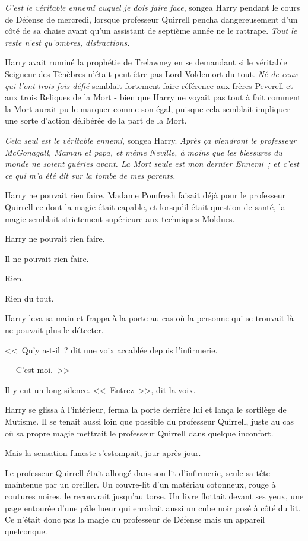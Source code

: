 \emph{C'est le véritable ennemi auquel je dois faire face}, songea Harry pendant le cours de Défense de mercredi, lorsque professeur Quirrell pencha dangereusement d'un côté de sa chaise avant qu'un assistant de septième année ne le rattrape. \emph{Tout le reste n'est qu'ombres, distractions.}

Harry avait ruminé la prophétie de Trelawney en se demandant si le véritable Seigneur des Ténèbres n'était peut être pas Lord Voldemort du tout. \emph{Né de ceux qui l'ont trois fois défié} semblait fortement faire référence aux frères Peverell et aux trois Reliques de la Mort - bien que Harry ne voyait pas tout à fait comment la Mort aurait pu le marquer comme son égal, puisque cela semblait impliquer une sorte d'action délibérée de la part de la Mort.

\emph{Cela seul est le véritable ennemi}, songea Harry. \emph{Après ça viendront le professeur McGonagall, Maman et papa, et même Neville, à moins que les blessures du monde ne soient guéries avant. La Mort seule est mon dernier Ennemi~; et c'est ce qui m'a été dit sur la tombe de mes parents.}

Harry ne pouvait rien faire. Madame Pomfresh faisait déjà pour le professeur Quirrell ce dont la magie était capable, et lorsqu'il était question de santé, la magie semblait strictement supérieure aux techniques Moldues.

Harry ne pouvait rien faire.

Il ne pouvait rien faire.

Rien.

Rien du tout.

\later

Harry leva sa main et frappa à la porte au cas où la personne qui se trouvait là ne pouvait plus le détecter.

<<~Qu'y a-t-il~? dit une voix accablée depuis l'infirmerie.

--- C'est moi.~>>

Il y eut un long silence. <<~Entrez~>>, dit la voix.

Harry se glissa à l'intérieur, ferma la porte derrière lui et lança le sortilège de Mutisme. Il se tenait aussi loin que possible du professeur Quirrell, juste au cas où sa propre magie mettrait le professeur Quirrell dans quelque inconfort.

Mais la sensation funeste s'estompait, jour après jour.

Le professeur Quirrell était allongé dans son lit d'infirmerie, seule sa tête maintenue par un oreiller. Un couvre-lit d'un matériau cotonneux, rouge à coutures noires, le recouvrait jusqu'au torse. Un livre flottait devant ses yeux, une page entourée d'une pâle lueur qui enrobait aussi un cube noir posé à côté du lit. Ce n'était donc pas la magie du professeur de Défense mais un appareil quelconque.

